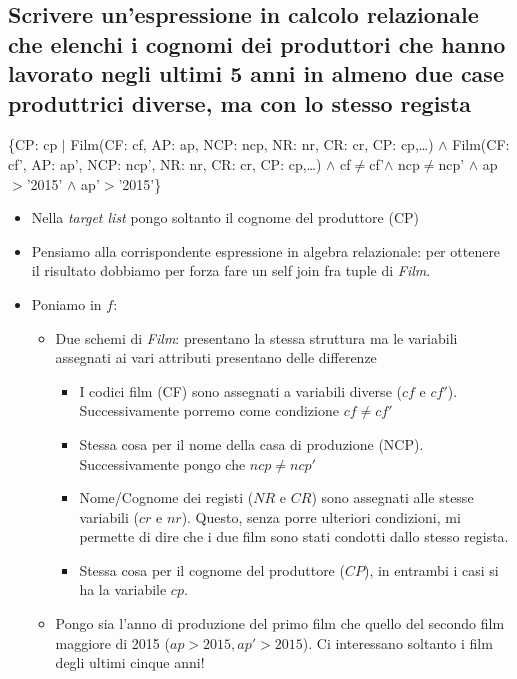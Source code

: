 \subsection*{Scrivere un’espressione in calcolo relazionale che elenchi i cognomi dei produttori che hanno lavorato negli ultimi 5 anni in almeno due case produttrici diverse, ma con lo stesso regista}
\{CP: cp $|$ Film(CF: cf, AP: ap, NCP: ncp, NR: nr, CR: cr, CP: cp,\dots) $\land$ Film(CF: cf’, AP: ap’, NCP:
ncp’, NR: nr, CR: cr, CP: cp,\dots) $\land$ cf$\neq$cf’$\land$ ncp$\neq$ncp’ $\land$ ap$>$’2015’ $\land$ ap’$>$’2015’\}
\begin{itemize}
	\item Nella \emph{target list} pongo soltanto il cognome del produttore (CP)
	\item Pensiamo alla corrispondente espressione in algebra relazionale: per ottenere il risultato dobbiamo per forza fare un self join fra tuple di \emph{Film}.
	\item Poniamo in $f$:
	\begin{itemize}
		\item Due schemi di \emph{Film}: presentano la stessa struttura ma le variabili assegnati ai vari attributi presentano delle differenze
		\begin{itemize}
			\item I codici film (CF) sono assegnati a variabili diverse ($cf$ e $cf'$). Successivamente porremo come condizione $cf \neq cf'$
			\item Stessa cosa per il nome della casa di produzione (NCP). Successivamente pongo che $ncp \neq ncp'$
			\item Nome/Cognome dei registi ($NR$ e $CR$) sono assegnati alle stesse variabili ($cr$ e $nr$). Questo, senza porre ulteriori condizioni, mi permette di dire che i due film sono stati condotti dallo stesso regista.
			\item Stessa cosa per il cognome del produttore ($CP$), in entrambi i casi si ha la variabile $cp$.
		\end{itemize}
		\item Pongo sia l'anno di produzione del primo film che quello del secondo film maggiore di 2015 ($ap > 2015, ap' > 2015$). Ci interessano soltanto i film degli ultimi cinque anni!
	\end{itemize}
\end{itemize}

